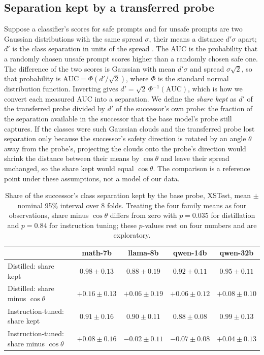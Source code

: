 \documentclass[10pt]{article}
\begin{document}
\subsection{Separation kept by a transferred probe}
\label{app:share}
Suppose a classifier's scores for safe prompts and for unsafe prompts are two Gaussian distributions with the same spread $\sigma$, their means a distance $d'\sigma$ apart; $d'$ is the class separation in units of the spread \citep{green1966,macmillan2005}. The AUC is the probability that a randomly chosen unsafe prompt scores higher than a randomly chosen safe one. The difference of the two scores is Gaussian with mean $d'\sigma$ and spread $\sigma\sqrt{2}$, so that probability is $\mathrm{AUC} = \Phi(d'/\sqrt{2})$, where $\Phi$ is the standard normal distribution function. Inverting gives $d' = \sqrt{2}\,\Phi^{-1}(\mathrm{AUC})$, which is how we convert each measured AUC into a separation. We define the \emph{share kept} as $d'$ of the transferred probe divided by $d'$ of the successor's own probe: the fraction of the separation available in the successor that the base model's probe still captures. If the classes were such Gaussian clouds and the transferred probe lost separation only because the successor's safety direction is rotated by an angle $\theta$ away from the probe's, projecting the clouds onto the probe's direction would shrink the distance between their means by $\cos\theta$ and leave their spread unchanged, so the share kept would equal $\cos\theta$. The comparison is a reference point under these assumptions, not a model of our data.

\begin{table}[ht]
\centering
\small
\begin{tabular}{lcccc}
\toprule
& math-7b & llama-8b & qwen-14b & qwen-32b \\
\midrule
Distilled: share kept & $0.98 \pm 0.13$ & $0.88 \pm 0.19$ & $0.92 \pm 0.11$ & $0.95 \pm 0.11$ \\
Distilled: share minus $\cos\theta$ & $+0.16 \pm 0.13$ & $+0.06 \pm 0.19$ & $+0.06 \pm 0.12$ & $+0.08 \pm 0.10$ \\
Instruction-tuned: share kept & $0.91 \pm 0.16$ & $0.90 \pm 0.11$ & $0.88 \pm 0.08$ & $0.99 \pm 0.13$ \\
Instruction-tuned: share minus $\cos\theta$ & $+0.08 \pm 0.16$ & $-0.02 \pm 0.11$ & $-0.07 \pm 0.08$ & $+0.04 \pm 0.13$ \\
\bottomrule
\end{tabular}
\caption{Share of the successor's class separation kept by the base probe, XSTest, mean $\pm$ nominal 95\% interval over 8 folds. Treating the four family means as four observations, share minus $\cos\theta$ differs from zero with $p = 0.035$ for distillation and $p = 0.84$ for instruction tuning; these $p$-values rest on four numbers and are exploratory.}
\label{tab:share}
\end{table}
\end{document}
